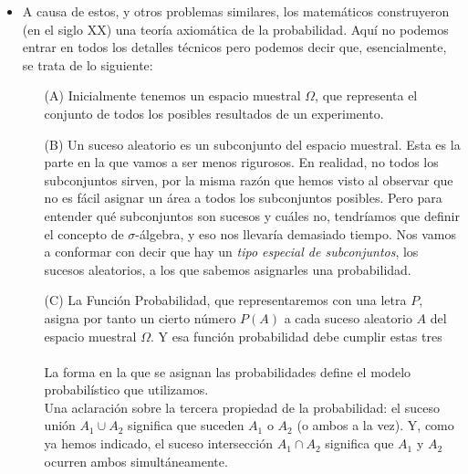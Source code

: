 \begin{itemize}
    \item  A causa de estos, y otros problemas similares, los matemáticos construyeron (en el siglo XX) una teoría axiomática de la probabilidad. Aquí no podemos entrar en todos los detalles técnicos pero podemos decir que, esencialmente, se trata de lo siguiente:
        \begin{itemize}
            \item[(A)] Inicialmente tenemos un {\sf espacio muestral} $\Omega$, que representa el conjunto de todos los posibles resultados de un experimento.
            \item[(B)] Un {\sf suceso aleatorio} es un subconjunto del espacio muestral. Esta es la parte en la que vamos a ser menos rigurosos. En realidad, no todos los subconjuntos sirven, por la misma razón que hemos visto al observar que no es fácil asignar un área a todos los subconjuntos posibles. Pero para entender qué subconjuntos son sucesos y cuáles no, tendríamos que definir el concepto de $\sigma$-álgebra, y eso nos llevaría demasiado tiempo. Nos vamos a conformar con decir que hay un {\em tipo especial de subconjuntos}, los sucesos aleatorios, a los que sabemos asignarles una probabilidad.
            \item[(C)] La {\sf Función Probabilidad}, que representaremos con una letra $P$,  asigna por tanto un cierto número $P(A)$ a cada suceso aleatorio $A$ del espacio muestral $\Omega$. Y esa función probabilidad debe cumplir estas tres\\[3mm]
                \\[3mm]
                La forma en la que se asignan las probabilidades define el {\sf modelo probabilístico} que utilizamos.\\
                Una aclaración sobre la tercera propiedad  de la probabilidad: el {\sf suceso unión} $A_1\cup A_2$ significa que suceden $A_1$ o $A_2$ (o ambos a la vez). Y, como ya hemos indicado, el {\sf suceso intersección} $A_1\cap A_2$ significa que $A_1$ y $A_2$ ocurren ambos simultáneamente.
        \end{itemize}


\end{itemize}
